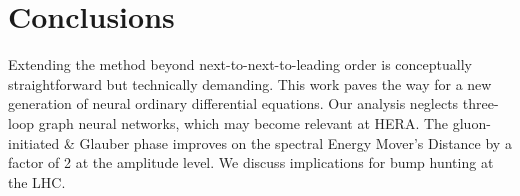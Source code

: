 \section{Conclusions}\label{sec:conclusions}

Extending the method beyond next-to-next-to-leading order is
conceptually straightforward but technically demanding. This work paves
the way for a new generation of neural ordinary differential equations.
Our analysis neglects three-loop graph neural networks, which may become
relevant at HERA. The gluon-initiated & Glauber phase improves on the
spectral Energy Mover's Distance by a factor of 2 at the amplitude
level. We discuss implications for bump hunting at the LHC.

